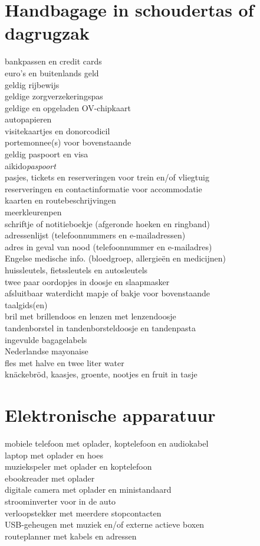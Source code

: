 \documentclass[9pt,twocolumn]{memoir}
\begin{document}
\section*{Handbagage in schoudertas of dagrugzak}%
bankpassen en credit cards\\%
euro's en buitenlands geld\\%
geldig rijbewijs\\%
geldige zorgverzekeringspas\\%
geldige en opgeladen OV-chipkaart\\%
autopapieren\\%
visitekaartjes en donorcodicil\\%
portemonnee(s) voor bovenstaande\\%
geldig paspoort en visa\\%
aikido{\itshape{paspoort}}\\%
pasjes, tickets en reserveringen voor trein en/of vliegtuig\\%
reserveringen en contactinformatie voor accommodatie\\%
kaarten en routebeschrijvingen\\%
meerkleurenpen\\%
schriftje of notitieboekje (afgeronde hoeken en ringband)\\%
adressenlijst (telefoonnummers en e-mailadressen)\\%
adres in geval van nood (telefoonnummer en e-mailadres)\\%
Engelse medische info. (bloedgroep, allergieën en medicijnen)\\%
huissleutels, fietssleutels en autosleutels\\%
twee paar oordopjes in doosje en slaapmasker\\%
afsluitbaar waterdicht mapje of bakje voor bovenstaande\\%
taalgids(en)\\%
bril met brillendoos en lenzen met lenzendoosje\\%
tandenborstel in tandenborsteldoosje en tandenpasta\\%
ingevulde bagagelabels\\%
Nederlandse mayonaise\\%
fles met halve en twee liter water\\%
knäckebröd, kaasjes, groente, nootjes en fruit in tasje%

\section*{Elektronische apparatuur}%
mobiele telefoon met oplader, koptelefoon en audiokabel\\%
laptop met oplader en hoes\\%
muziekspeler met oplader en koptelefoon\\%
ebookreader met oplader\\%
digitale camera met oplader en ministandaard\\%
stroominverter voor in de auto\\%
verloopstekker met meerdere stopcontacten\\%
USB-geheugen met muziek en/of externe actieve boxen\\%
routeplanner met kabels en adressen%
\end{document}
